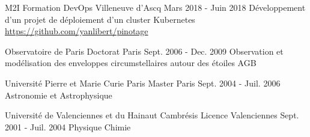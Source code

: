 

\begin{cventries}


  \cventry
    {M2I} %
    {Formation DevOps} %
    {Villeneuve d'Ascq} %
    {Mars 2018 - Juin 2018} %
    {
    Développement d'un projet de déploiement d'un cluster Kubernetes \url{https://github.com/yanlibert/pinotage} 
    }


  \cventry
    {Observatoire de Paris}
    {Doctorat}
    {Paris} %
    {Sept. 2006 - Dec. 2009} %
    {Observation et modélisation des enveloppes circumstellaires autour des étoiles AGB} %
    
  \cventry
    {Université Pierre et Marie Curie Paris} %
    {Master} %
    {Paris} %
    {Sept. 2004 - Juil. 2006} %
    {Astronomie et Astrophysique}

  \cventry
    {Université de Valenciennes et du Hainaut Cambrésis} %
    {Licence} %
    {Valenciennes} %
    {Sept. 2001 - Juil. 2004} %
    {Physique Chimie}

\end{cventries}

